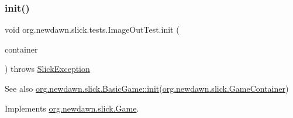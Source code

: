 \subsubsection{\texorpdfstring{init()}{init()}}
{\footnotesize\ttfamily void org.\+newdawn.\+slick.\+tests.\+Image\+Out\+Test.\+init (\begin{DoxyParamCaption}\item[{\mbox{\hyperlink{classorg_1_1newdawn_1_1slick_1_1_game_container}{Game\+Container}}}]{container }\end{DoxyParamCaption}) throws \mbox{\hyperlink{classorg_1_1newdawn_1_1slick_1_1_slick_exception}{Slick\+Exception}}\hspace{0.3cm}{\ttfamily [inline]}}

\begin{DoxySeeAlso}{See also}
\mbox{\hyperlink{classorg_1_1newdawn_1_1slick_1_1_basic_game_a8af0900217e4d389249f71367b22d114}{org.\+newdawn.\+slick.\+Basic\+Game\+::init}}(\mbox{\hyperlink{classorg_1_1newdawn_1_1slick_1_1_game_container}{org.\+newdawn.\+slick.\+Game\+Container}}) 
\end{DoxySeeAlso}


Implements \mbox{\hyperlink{interfaceorg_1_1newdawn_1_1slick_1_1_game_ad2dd6affab08bb8fdb5fab0815957b7a}{org.\+newdawn.\+slick.\+Game}}.


